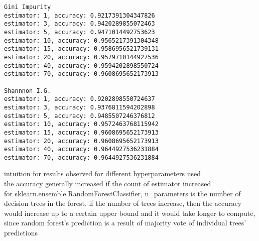 \documentclass[12pt, border = 4pt, multi]{article} %
\begin{document}
\begin{verbatim}
Gini Impurity
estimator: 1, accuracy: 0.9217391304347826
estimator: 3, accuracy: 0.9420289855072463
estimator: 5, accuracy: 0.9471014492753623
estimator: 10, accuracy: 0.9565217391304348
estimator: 15, accuracy: 0.9586956521739131
estimator: 20, accuracy: 0.9579710144927536
estimator: 40, accuracy: 0.9594202898550724
estimator: 70, accuracy: 0.9608695652173913

Shannnon I.G.
estimator: 1, accuracy: 0.9202898550724637
estimator: 3, accuracy: 0.9376811594202898
estimator: 5, accuracy: 0.9485507246376812
estimator: 10, accuracy: 0.9572463768115942
estimator: 15, accuracy: 0.9608695652173913
estimator: 20, accuracy: 0.9608695652173913
estimator: 40, accuracy: 0.9644927536231884
estimator: 70, accuracy: 0.9644927536231884
\end{verbatim}
intuition for results observed for different hyperparameters used\\
the accuracy generally increased if the count of estimator increased\\
for sklearn.ensemble.RandomForestClassifier, n\_parameters is the number of decision trees in the forest. if the number of trees increase, then the accuracy would increase up to a certain upper bound and it would take longer to compute, since random forest's prediction is a result of majority vote of individual trees' predictions\\
\end{document}

